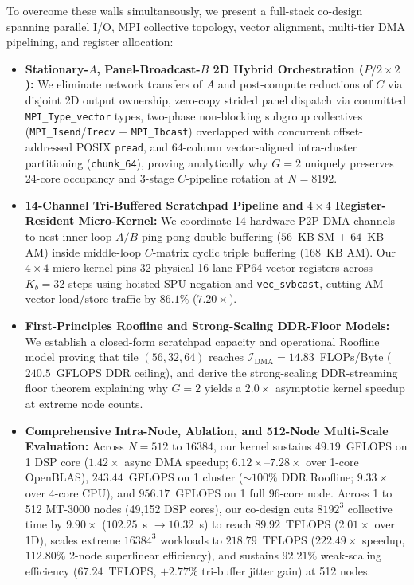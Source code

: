 \documentclass[journal]{IEEEtran}
\begin{document}
To overcome these walls simultaneously, we present a full-stack co-design spanning parallel I/O, MPI collective topology, vector alignment, multi-tier DMA pipelining, and register allocation:
\begin{itemize}\setlength{\itemsep}{0.5pt}\setlength{\parskip}{0pt}
    \item \textbf{Stationary-$A$, Panel-Broadcast-$B$ 2D Hybrid Orchestration ($P/2 \times 2$):} We eliminate network transfers of $A$ and post-compute reductions of $C$ via disjoint 2D output ownership, zero-copy strided panel dispatch via committed \texttt{MPI\_Type\_vector} types, two-phase non-blocking subgroup collectives (\texttt{MPI\_Isend}/\texttt{Irecv} + \texttt{MPI\_Ibcast}) overlapped with concurrent offset-addressed POSIX \texttt{pread}, and 64-column vector-aligned intra-cluster partitioning (\texttt{chunk\_64}), proving analytically why $G=2$ uniquely preserves 24-core occupancy and 3-stage $C$-pipeline rotation at $N=8192$.
    \item \textbf{14-Channel Tri-Buffered Scratchpad Pipeline and $4 \times 4$ Register-Resident Micro-Kernel:} We coordinate 14 hardware P2P DMA channels to nest inner-loop $A/B$ ping-pong double buffering ($56$~KB SM + $64$~KB AM) inside middle-loop $C$-matrix cyclic triple buffering ($168$~KB AM). Our $4 \times 4$ micro-kernel pins 32 physical 16-lane FP64 vector registers across $K_b=32$ steps using hoisted SPU negation and \texttt{vec\_svbcast}, cutting AM vector load/store traffic by $86.1\%$ ($7.20\times$).
    \item \textbf{First-Principles Roofline and Strong-Scaling DDR-Floor Models:} We establish a closed-form scratchpad capacity and operational Roofline model proving that tile $(56, 32, 64)$ reaches $\mathcal{I}_{\mathrm{DMA}} = 14.83$~FLOPs/Byte ($240.5$~GFLOPS DDR ceiling), and derive the strong-scaling DDR-streaming floor theorem explaining why $G=2$ yields a $2.0\times$ asymptotic kernel speedup at extreme node counts.
    \item \textbf{Comprehensive Intra-Node, Ablation, and 512-Node Multi-Scale Evaluation:} Across $N=512$ to $16384$, our kernel sustains $49.19$~GFLOPS on 1 DSP core ($1.42\times$ async DMA speedup; $6.12\times$--$7.28\times$ over 1-core OpenBLAS), $243.44$~GFLOPS on 1 cluster ($\sim\!100\%$ DDR Roofline; $9.33\times$ over 4-core CPU), and $956.17$~GFLOPS on 1 full 96-core node. Across 1 to 512 MT-3000 nodes (49,152 DSP cores), our co-design cuts $8192^3$ collective time by $9.90\times$ ($102.25$~s $\to 10.32$~s) to reach $89.92$~TFLOPS ($2.01\times$ over 1D), scales extreme $16384^3$ workloads to $218.79$~TFLOPS ($222.49\times$ speedup, $112.80\%$ 2-node superlinear efficiency), and sustains $92.21\%$ weak-scaling efficiency ($67.24$~TFLOPS, $+2.77\%$ tri-buffer jitter gain) at 512 nodes.
\end{itemize}
\end{document}
